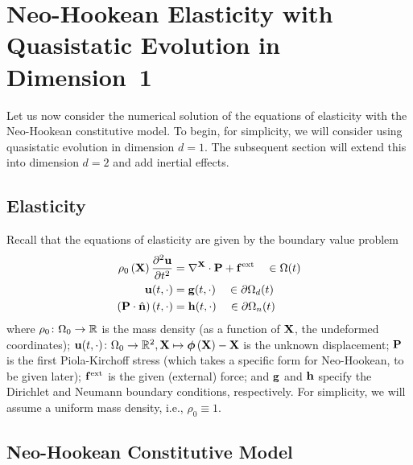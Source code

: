 \section{Neo-Hookean Elasticity with Quasistatic Evolution in Dimension~1}

Let us now consider the numerical solution of the equations of elasticity with the Neo-Hookean constitutive model. To begin, for simplicity, we will consider using quasistatic evolution in dimension $d = 1$. The subsequent section will extend this into dimension $d = 2$ and add inertial effects.

\subsection{Elasticity}

Recall that the equations of elasticity are given by the boundary value problem
\begin{subequations}\label{eq:elasticity.i}
\begin{align}
\rho_0 \left( \mathbf{X} \right) \frac{\partial^2 \mathbf{u}}{\partial t^2} & = \nabla^{\mathbf{X}} \cdot \mathbf{P} + \mathbf{f}^{\text{ext}} \quad \in \Omega(t) \\
\mathbf{u}(t,\cdot) & = \mathbf{g}(t,\cdot) \quad \in \partial \Omega_d(t) \\
\left( \mathbf{P} \cdot \hat{\mathbf{n}} \right) (t,\cdot) & = \mathbf{h}(t,\cdot) \quad \in \partial \Omega_n(t)
\end{align}
\end{subequations}
where $\rho_0 \colon \Omega_0 \to \mathbb{R}$ is the mass density (as a function of $\mathbf{X}$, the undeformed coordinates); $\mathbf{u}(t,\cdot) \colon \Omega_0 \to \mathbb{R}^2, \mathbf{X} \mapsto \boldsymbol{\phi} \left( \mathbf{X} \right) - \mathbf{X}$ is the unknown displacement; $\mathbf{P}$ is the first Piola-Kirchoff stress (which takes a specific form for Neo-Hookean, to be given later); $\mathbf{f}^{\text{ext}}$ is the given (external) force; and $\mathbf{g}$ and $\mathbf{h}$ specify the Dirichlet and Neumann boundary conditions, respectively. For simplicity, we will assume a uniform mass density, i.e., $\rho_0 \equiv 1$.

\subsection{Neo-Hookean Constitutive Model}

